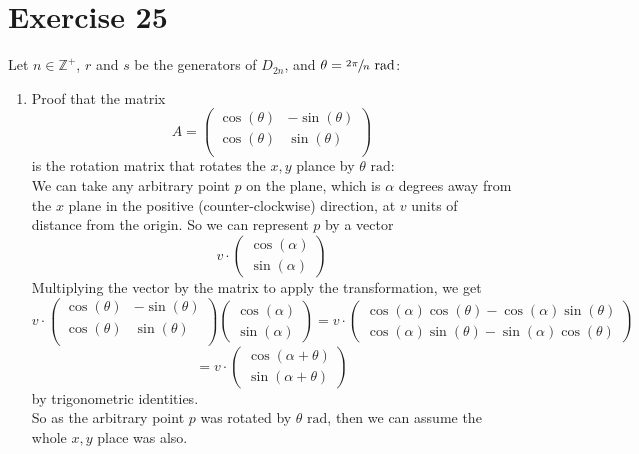\documentclass[12pt]{article}
\newcommand{\Z}{\mathbb{Z}}
\newcommand{\rad}{\text{ rad}}
\begin{document}
    \section*{Exercise 25}
    Let $n \in \Z^+$, $r$ and $s$ be the generators of $D_{2n}$,
    and $\theta = \sfrac{2 \pi}{n} \rad$: \\
    \begin{enumerate}[label=\textbf{\alph*.}]
        \item 
            Proof that the matrix
            \[ A  = \begin{pmatrix}
                \cos(\theta) & -\sin(\theta) \\
                \cos(\theta) & \sin(\theta) \\
            \end{pmatrix} \]
            is the rotation matrix that rotates the $x, y$ plance
            by $\theta \rad$: \\
            We can take any arbitrary point $p$ on the plane,
            which is $\alpha$ degrees away from the $x$ plane in the positive
            (counter-clockwise) direction,
            at $v$ units of distance from the origin.
            So we can represent $p$ by a vector
            \[v \cdot \begin{pmatrix}
                \cos(\alpha) \\
                \sin(\alpha)
            \end{pmatrix} \]
            Multiplying the vector by the matrix to apply the transformation,
            we get
            \[ v \cdot \begin{pmatrix}
                \cos(\theta) & -\sin(\theta) \\
                \cos(\theta) & \sin(\theta) \\
            \end{pmatrix}
            \begin{pmatrix}
                \cos(\alpha) \\
                \sin(\alpha)
            \end{pmatrix} 
            = v \cdot \begin{pmatrix}
                \cos(\alpha)\cos(\theta) - \cos(\alpha)\sin(\theta) \\
                \cos(\alpha)\sin(\theta) - \sin(\alpha)\cos(\theta)
            \end{pmatrix} \]
            \[ = v \cdot \begin{pmatrix}
                \cos(\alpha + \theta) \\
                \sin(\alpha + \theta)
            \end{pmatrix} \]
            by trigonometric identities. \\
            So as the arbitrary point $p$ was rotated by $\theta \rad$,
            then we can assume the whole $x, y$ place was also.
            

\end{enumerate}
\end{document}
